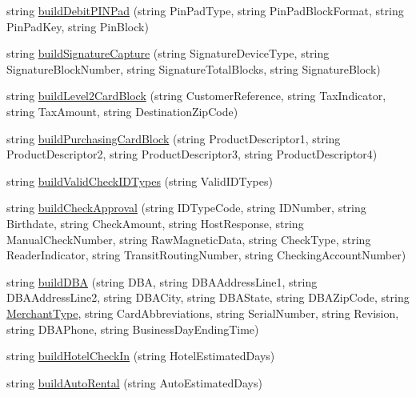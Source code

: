\begin{DoxyCompactItemize}
\item 
string \mbox{\hyperlink{class_form_sim_1_1_t_c_p_handler_aed895ee0544cd2dde70e21f36e6f4dea}{build\+Debit\+P\+I\+N\+Pad}} (string Pin\+Pad\+Type, string Pin\+Pad\+Block\+Format, string Pin\+Pad\+Key, string Pin\+Block)
\item 
string \mbox{\hyperlink{class_form_sim_1_1_t_c_p_handler_af6d62ad6f754a7cfd9fad3155e8c5f3d}{build\+Signature\+Capture}} (string Signature\+Device\+Type, string Signature\+Block\+Number, string Signature\+Total\+Blocks, string Signature\+Block)
\item 
string \mbox{\hyperlink{class_form_sim_1_1_t_c_p_handler_a4494caac6dd36e0e0594f65e005d026b}{build\+Level2\+Card\+Block}} (string Customer\+Reference, string Tax\+Indicator, string Tax\+Amount, string Destination\+Zip\+Code)
\item 
string \mbox{\hyperlink{class_form_sim_1_1_t_c_p_handler_afcfca846d1c87622f6cc3f5de84aba46}{build\+Purchasing\+Card\+Block}} (string Product\+Descriptor1, string Product\+Descriptor2, string Product\+Descriptor3, string Product\+Descriptor4)
\item 
string \mbox{\hyperlink{class_form_sim_1_1_t_c_p_handler_a380074a847d4b03c770e89785ff82862}{build\+Valid\+Check\+I\+D\+Types}} (string Valid\+I\+D\+Types)
\item 
string \mbox{\hyperlink{class_form_sim_1_1_t_c_p_handler_af66532d5978fe3b5e83e8ee48aa9cc8e}{build\+Check\+Approval}} (string I\+D\+Type\+Code, string I\+D\+Number, string Birthdate, string Check\+Amount, string Host\+Response, string Manual\+Check\+Number, string Raw\+Magnetic\+Data, string Check\+Type, string Reader\+Indicator, string Transit\+Routing\+Number, string Checking\+Account\+Number)
\item 
string \mbox{\hyperlink{class_form_sim_1_1_t_c_p_handler_a30576763872fd47bd1db76adffeaac2e}{build\+D\+BA}} (string D\+BA, string D\+B\+A\+Address\+Line1, string D\+B\+A\+Address\+Line2, string D\+B\+A\+City, string D\+B\+A\+State, string D\+B\+A\+Zip\+Code, string \mbox{\hyperlink{class_form_sim_1_1_generic_handler_a8b7d568966660d7d3700eac963caa504}{Merchant\+Type}}, string Card\+Abbreviations, string Serial\+Number, string Revision, string D\+B\+A\+Phone, string Business\+Day\+Ending\+Time)
\item 
string \mbox{\hyperlink{class_form_sim_1_1_t_c_p_handler_a0979d7d654863f637e6df1ad0af814c2}{build\+Hotel\+Check\+In}} (string Hotel\+Estimated\+Days)
\item 
string \mbox{\hyperlink{class_form_sim_1_1_t_c_p_handler_a6e587238891dd24c1b46b35c5fef08c4}{build\+Auto\+Rental}} (string Auto\+Estimated\+Days)

\end{DoxyCompactItemize}
